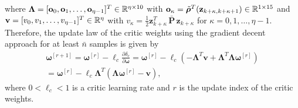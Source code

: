 \documentclass[conference]{IEEEtran}
\begin{document}
 where $\bm{\Lambda} = [{\bf o}_0,{\bf o}_1,\ldots,{\bf o}_{\eta-1}]^T \in \mathbb{R}^{\eta\times 10}$ with ${\bf o}_\kappa = \tilde{\bm{\rho}}^T({\bf z}_{k+\kappa, k+\kappa+1}) \in \mathbb{R}^{1\times 15}$ and ${\bf v} =[v_0,v_1,\ldots,v_{\eta-1}]^T \in \mathbb{R}^{\eta}$ with $v_\kappa = \frac{1}{2}\mathbf{z}_{k+\kappa}^T \, \bar{\mathbf{P}} \, \mathbf{z}_{k+\kappa}$ for $\kappa = 0,1,\ldots, \eta-1$. %
 Therefore, the update law of the critic weights using the gradient decent approach for at least $\bar n$ samples is given by %
 \begin{multline}
   \bm{\omega}^{[r+1]} = \bm{\omega}^{[r]} - \ell_c\frac{\partial\delta_c}{\partial \bm{\omega}} = \bm{\omega}^{[r]} - \ell_c\left(-\bm{\Lambda}^T\mathbf{v} + \bm{\Lambda}^T \bm{\Lambda}\bm{\omega}^{[r]}\right)\\ 
 =\bm{\omega}^{[r]} - \ell_c \bm{\Lambda}^T\left(\bm{\Lambda}\bm{\omega}^{[r]}-\mathbf{v}\right), 
 \label{eq:criticWeights}
 \end{multline}
 where $0<\ell_c<1$ is a critic learning rate and $r$ is the  update index of the critic weights. 
\end{document}
